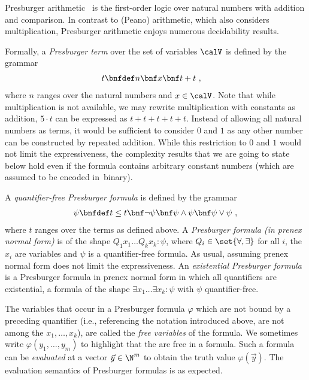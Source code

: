 \documentclass[../../diss.tex]{subfiles}
\begin{document}
Presburger arithmetic~\cite{Presburger31} is the first-order logic over natural numbers with addition and comparison.
In contrast to (Peano) arithmetic, which also considers multiplication, Presburger arithmetic enjoys numerous decidability results.

Formally, a \emph{Presburger term} over the set of variables $\vars$ is defined by the grammar
\begin{align*}
    t & \bnfdef n \bnf x \bnf t+t
    \ ,
\end{align*}
where $n$ ranges over the natural numbers and $x \in \vars$.
Note that while multiplication is not available, we may rewrite multiplication with constants as addition, \eg $5 \cdot t$ can be expressed as $t + t + t + t +t$.
Instead of allowing all natural numbers as terms, it would be sufficient to consider $0$ and $1$ as any other number can be constructed by repeated addition.
While this restriction to $0$ and $1$ would not limit the expressiveness, the complexity results that we are going to state below hold even if the formula contains arbitrary constant numbers (which are assumed to be encoded in~binary).

A \emph{quantifier-free Presburger formula} is defined by the grammar
\begin{align*}
    \psi \bnfdef t\leq t \bnf \neg \psi \bnf \psi \wedge \psi \bnf \psi \vee \psi
    \ ,
\end{align*}
    where $t$ ranges over the terms as defined above.
A \emph{Presburger formula (in prenex normal form)} is of the shape $Q_1 x_1 \ldots Q_k x_k \colon \psi$, where $Q_i \in \set{ \forall, \exists}$ for all $i$, the $x_i$ are variables and $\psi$ is a quantifier-free formula.
As usual, assuming prenex normal form does not limit the expressiveness.
An \emph{existential Presburger formula} is a Presburger formula in prenex normal form in which all quantifiers are existential, \ie a formula of the shape $\exists x_1 \ldots \exists x_k \colon \psi$ with $\psi$ quantifier-free.

The variables that occur in a Presburger formula $\varphi$ which are not bound by a preceding quantifier (i.e., referencing the notation introduced above, are not among the $x_1, \ldots, x_k$), are called the \emph{free variables} of the formula.
We sometimes write $\varphi(y_1, \ldots, y_m)$ to highlight that the  are free in a formula.
Such a formula can be \emph{evaluated} at a vector $\vec{y} \in \N^m$ to obtain the truth value $\varphi(\vec{y})$.
The evaluation semantics of Presburger formulas is as expected.
\end{document}
